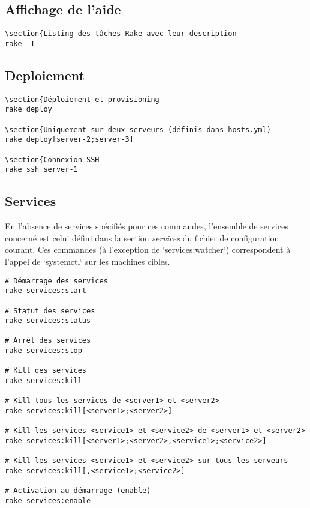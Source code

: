 \documentclass[a4paper,oneside,10pt]{article}
\begin{document}
\subsection{Affichage de l'aide}

\begin{verbatim}
\section{Listing des tâches Rake avec leur description
rake -T
\end{verbatim}

\subsection{Deploiement}

\begin{verbatim}
\section{Déploiement et provisioning
rake deploy

\section{Uniquement sur deux serveurs (définis dans hosts.yml)
rake deploy[server-2;server-3]

\section{Connexion SSH
rake ssh server-1
\end{verbatim}

\subsection{Services}

En l'absence de services spécifiés pour ces commandes, l'ensemble de services
concerné est celui défini dans la section \textit{services} du fichier de configuration
courant. Ces commandes (à l'exception de `services:watcher`) correspondent
à l'appel de `systemctl` sur les machines cibles.

\begin{verbatim}
# Démarrage des services
rake services:start

# Statut des services
rake services:status

# Arrêt des services
rake services:stop

# Kill des services
rake services:kill

# Kill tous les services de <server1> et <server2>
rake services:kill[<server1>;<server2>]

# Kill les services <service1> et <service2> de <server1> et <server2>
rake services:kill[<server1>;<server2>,<service1>;<service2>]

# Kill les services <service1> et <service2> sur tous les serveurs
rake services:kill[,<service1>;<service2>]

# Activation au démarrage (enable)
rake services:enable
\end{verbatim}
\end{document}
